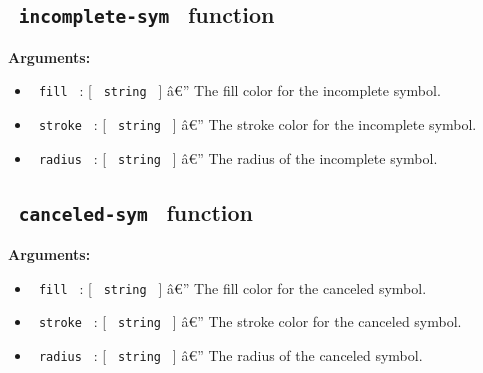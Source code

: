 \subsection{\texorpdfstring{\texttt{\ incomplete-sym\ }
function}{ incomplete-sym  function}}\label{incomplete-sym-function}

\begin{Shaded}
\begin{Highlighting}[]
\end{Highlighting}
\end{Shaded}

\textbf{Arguments:}

\begin{itemize}
\tightlist
\item
  \texttt{\ fill\ } : {[} \texttt{\ string\ } {]} â€'' The fill color
  for the incomplete symbol.
\item
  \texttt{\ stroke\ } : {[} \texttt{\ string\ } {]} â€'' The stroke
  color for the incomplete symbol.
\item
  \texttt{\ radius\ } : {[} \texttt{\ string\ } {]} â€'' The radius of
  the incomplete symbol.
\end{itemize}

\subsection{\texorpdfstring{\texttt{\ canceled-sym\ }
function}{ canceled-sym  function}}\label{canceled-sym-function}

\begin{Shaded}
\begin{Highlighting}[]
\end{Highlighting}
\end{Shaded}

\textbf{Arguments:}

\begin{itemize}
\tightlist
\item
  \texttt{\ fill\ } : {[} \texttt{\ string\ } {]} â€'' The fill color
  for the canceled symbol.
\item
  \texttt{\ stroke\ } : {[} \texttt{\ string\ } {]} â€'' The stroke
  color for the canceled symbol.
\item
  \texttt{\ radius\ } : {[} \texttt{\ string\ } {]} â€'' The radius of
  the canceled symbol.
\end{itemize}

